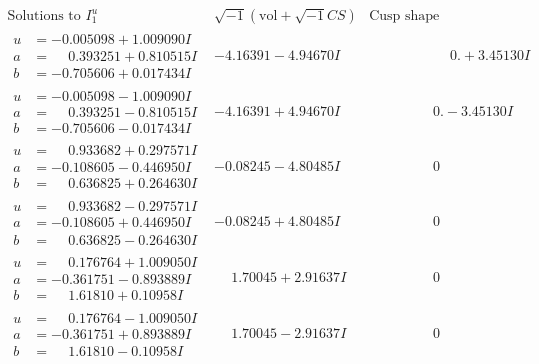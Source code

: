 \documentclass[1p]{elsarticle_modified}
\theoremstyle{definition}
\newcommand{\I}{\sqrt{-1}}
\begin{document}
$$\begin{array}{c|c|c}  
\text{Solutions to }I^u_{1}& \I (\text{vol} + \sqrt{-1}CS) & \text{Cusp shape}\\
 \hline 
\begin{aligned}
u &= -0.005098 + 1.009090 I \\
a &= \phantom{-}0.393251 + 0.810515 I \\
b &= -0.705606 + 0.017434 I\end{aligned}
 & -4.16391 - 4.94670 I & \phantom{-0.000000 -}0. + 3.45130 I \\ \hline\begin{aligned}
u &= -0.005098 - 1.009090 I \\
a &= \phantom{-}0.393251 - 0.810515 I \\
b &= -0.705606 - 0.017434 I\end{aligned}
 & -4.16391 + 4.94670 I & \phantom{-0.000000 } 0. - 3.45130 I \\ \hline\begin{aligned}
u &= \phantom{-}0.933682 + 0.297571 I \\
a &= -0.108605 - 0.446950 I \\
b &= \phantom{-}0.636825 + 0.264630 I\end{aligned}
 & -0.08245 - 4.80485 I & \phantom{-0.000000 } 0 \\ \hline\begin{aligned}
u &= \phantom{-}0.933682 - 0.297571 I \\
a &= -0.108605 + 0.446950 I \\
b &= \phantom{-}0.636825 - 0.264630 I\end{aligned}
 & -0.08245 + 4.80485 I & \phantom{-0.000000 } 0 \\ \hline\begin{aligned}
u &= \phantom{-}0.176764 + 1.009050 I \\
a &= -0.361751 - 0.893889 I \\
b &= \phantom{-}1.61810 + 0.10958 I\end{aligned}
 & \phantom{-}1.70045 + 2.91637 I & \phantom{-0.000000 } 0 \\ \hline\begin{aligned}
u &= \phantom{-}0.176764 - 1.009050 I \\
a &= -0.361751 + 0.893889 I \\
b &= \phantom{-}1.61810 - 0.10958 I\end{aligned}
 & \phantom{-}1.70045 - 2.91637 I & \phantom{-0.000000 } 0 \\ \hline\begin{aligned}

\end{aligned}
\end{array}$$
\end{document}

